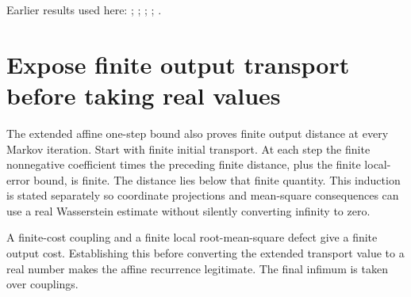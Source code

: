 \documentclass[11pt,a4paper]{article}
\begin{document}
Earlier results used here: \cite[Section~3.15.3]{LangevinLean2026ULASC}; \cite[Section~3.17.3]{LangevinLean2026ULASC}; \cite[Section~3.17.4]{LangevinLean2026ULASC}; \cite[Section~3.33.11]{LangevinLean2026ULASC}; \cite[Section~3.33.6]{LangevinLean2026ULASC}.

\section{\texorpdfstring{Expose finite output transport before taking real values}{Expose finite output transport before taking real values}}


The extended affine one-step bound also proves finite output distance at every Markov iteration. Start with finite initial transport. At each step the finite nonnegative coefficient times the preceding finite distance, plus the finite local-error bound, is finite. The distance lies below that finite quantity. This induction is stated separately so coordinate projections and mean-square consequences can use a real Wasserstein estimate without silently converting infinity to zero.



A finite-cost coupling and a finite local root-mean-square defect give a finite output cost. Establishing this before converting the extended transport value to a real number makes the affine recurrence legitimate. The final infimum is taken over couplings.
\end{document}
